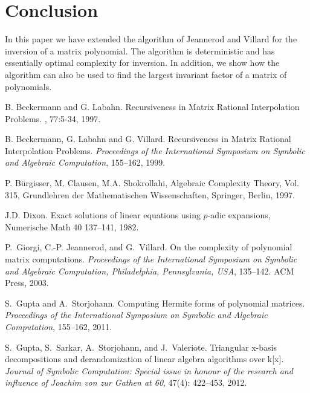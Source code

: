 \documentclass[a4paper,11pt]{article}
\begin{document}
\section{Conclusion}

In this paper we have extended the algorithm of Jeannerod and Villard for the inversion of a matrix polynomial. The algorithm is deterministic and has essentially optimal complexity for inversion. In addition, we show how the algorithm can also be used to find the largest invariant factor of a matrix of polynomials.


\begin{thebibliography}{22}


B. Beckermann and G. Labahn.
\newblock Recursiveness in Matrix Rational Interpolation Problems.
, 77:5-34, 1997.

B. Beckermann, G. Labahn and G. Villard.
\newblock Recursiveness in Matrix Rational Interpolation Problems.
\newblock \emph{Proceedings of the International Symposium on Symbolic and
  Algebraic Computation}, 155--162, 1999.
  
P. B\"urgisser, M. Clausen, M.A. Shokrollahi, Algebraic Complexity Theory, Vol. 315, 
\newblock Grundlehren der Mathematischen Wissenschaften, Springer, Berlin, 1997.

J.D. Dixon.
\newblock Exact solutions of linear equations using $p$-adic expansions,
\newblock Numerische Math 40 137--141, 1982.

P.~Giorgi, C.-P. Jeannerod, and G.~Villard.
\newblock On the complexity of polynomial matrix computations.
\newblock \emph{{Proceedings of the International Symposium on Symbolic and
  Algebraic Computation, Philadelphia, Pennsylvania, USA}}, 135--142. ACM
  Press, 2003.

S.~Gupta and A.~Storjohann.
\newblock Computing {H}ermite forms of polynomial matrices.
\newblock \emph{Proceedings of the International Symposium on Symbolic and
  Algebraic Computation}, 155--162, 2011.

S.~Gupta, S.~Sarkar, A.~Storjohann, and J.~Valeriote.
\newblock Triangular x-basis decompositions and derandomization of linear
  algebra algorithms over k[x].
\newblock \emph{Journal of Symbolic Computation: Special issue in honour of the
  research and influence of Joachim von zur Gathen at 60}, 47(4):
  422--453, 2012.
  

\end{thebibliography}
\end{document}
